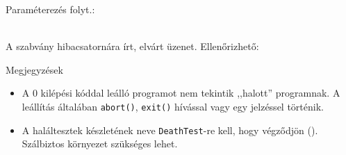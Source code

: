 \begin{frame}
  Paraméterezés folyt.:
  \begin{description}[mm]
    \item[\emph{matcher}] \hfill\\ A szabvány hibacsatornára írt, elvárt üzenet. Ellenőrizhető:
  \end{description}
  Megjegyzések
  \begin{itemize}
    \item A 0 kilépési kóddal leálló programot nem tekintik ,,halott'' programnak. A leállítás általában 
\texttt{abort()}, \texttt{exit()} hívással vagy egy jelzéssel történik.
    \item A haláltesztek készletének neve \texttt{DeathTest}-re kell, hogy végződjön 
(). 
Szálbiztos környezet szükséges lehet.
  \end{itemize}
\end{frame}
